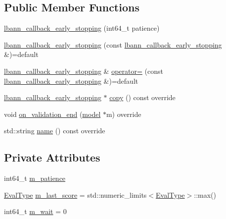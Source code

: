 \subsection*{Public Member Functions}
\begin{DoxyCompactItemize}
\item 
\hyperlink{classlbann_1_1lbann__callback__early__stopping_ac0140e05eccd5280d53a8e8d480c0ce3}{lbann\+\_\+callback\+\_\+early\+\_\+stopping} (int64\+\_\+t patience)
\item 
\hyperlink{classlbann_1_1lbann__callback__early__stopping_a7ff0175e34065c24d2c4090ff90ef614}{lbann\+\_\+callback\+\_\+early\+\_\+stopping} (const \hyperlink{classlbann_1_1lbann__callback__early__stopping}{lbann\+\_\+callback\+\_\+early\+\_\+stopping} \&)=default
\item 
\hyperlink{classlbann_1_1lbann__callback__early__stopping}{lbann\+\_\+callback\+\_\+early\+\_\+stopping} \& \hyperlink{classlbann_1_1lbann__callback__early__stopping_a34c805a2d45651efe3adaa012dc53fa5}{operator=} (const \hyperlink{classlbann_1_1lbann__callback__early__stopping}{lbann\+\_\+callback\+\_\+early\+\_\+stopping} \&)=default
\item 
\hyperlink{classlbann_1_1lbann__callback__early__stopping}{lbann\+\_\+callback\+\_\+early\+\_\+stopping} $\ast$ \hyperlink{classlbann_1_1lbann__callback__early__stopping_aa8e7bd4e9dde8e57dbc416dc75e25cc6}{copy} () const override
\item 
void \hyperlink{classlbann_1_1lbann__callback__early__stopping_a32eb9c5e763c97ab1162cfebea7ad049}{on\+\_\+validation\+\_\+end} (\hyperlink{classlbann_1_1model}{model} $\ast$m) override
\item 
std\+::string \hyperlink{classlbann_1_1lbann__callback__early__stopping_a3fce0ab7696bc24dd9b3330815c5a495}{name} () const override
\end{DoxyCompactItemize}
\subsection*{Private Attributes}
\begin{DoxyCompactItemize}
\item 
int64\+\_\+t \hyperlink{classlbann_1_1lbann__callback__early__stopping_ada95898e18dbed5adf1848919affd6ee}{m\+\_\+patience}
\item 
\hyperlink{base_8hpp_a3266f5ac18504bbadea983c109566867}{Eval\+Type} \hyperlink{classlbann_1_1lbann__callback__early__stopping_a64868be121d63a94344023b466cec494}{m\+\_\+last\+\_\+score} = std\+::numeric\+\_\+limits$<$\hyperlink{base_8hpp_a3266f5ac18504bbadea983c109566867}{Eval\+Type}$>$\+::max()
\item 
int64\+\_\+t \hyperlink{classlbann_1_1lbann__callback__early__stopping_acd0363fdc85a9ab0a77687ecfa827a1e}{m\+\_\+wait} = 0
\end{DoxyCompactItemize}
